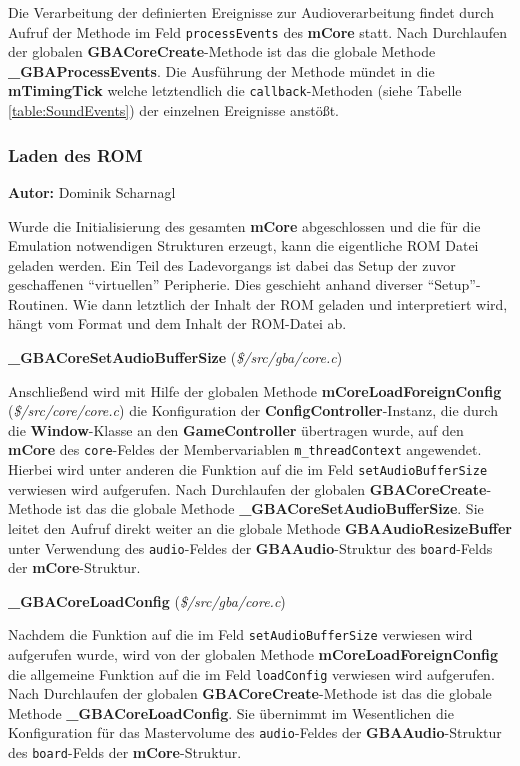 \documentclass[11pt,a4paper]{scrartcl}
\newcommand{\AutorDominik} {
    \vspace{-4mm}
    \large \textbf{Autor:} Dominik Scharnagl \normalsize
    \vspace{2mm}
}
\newcommand{\paratitlecode}[2] {
    \vspace{5mm}
    \large \textbf{#1} \normalsize(\textit{\${#2}})
    \vspace{2mm}\newline
}
\begin{document}
Die Verarbeitung der definierten Ereignisse zur Audioverarbeitung findet durch Aufruf der Methode im Feld \verb|processEvents| des \textbf{mCore} statt. Nach Durchlaufen der globalen \textbf{GBACoreCreate}-Methode ist das die globale Methode \textbf{{\_}GBAProcessEvents}. Die Ausf\"uhrung der Methode m\"undet in die \textbf{mTimingTick} welche letztendlich die \verb|callback|-Methoden (siehe Tabelle \ref{table:SoundEvents}) der einzelnen Ereignisse anst\"o{\ss}t.


\newpage
\subsubsection{Laden des ROM}
\AutorDominik

Wurde die Initialisierung des gesamten \textbf{mCore} abgeschlossen und die f\"ur die Emulation notwendigen Strukturen erzeugt, kann die eigentliche ROM Datei geladen werden. Ein Teil des Ladevorgangs ist dabei das Setup der zuvor geschaffenen \enquote{virtuellen} Peripherie. Dies geschieht anhand diverser \enquote{Setup}-Routinen. Wie dann letztlich der Inhalt der ROM geladen und interpretiert wird, h\"angt vom Format und dem Inhalt der ROM-Datei ab.

\paratitlecode{{\_}GBACoreSetAudioBufferSize}{/src/gba/core.c}
Anschlie{\ss}end wird mit Hilfe der globalen Methode \textbf{mCoreLoadForeignConfig} (\textit{\$/src/core/core.c}) die Konfiguration der \textbf{ConfigController}-Instanz, die durch die \textbf{Window}-Klasse an den \textbf{GameController} \"ubertragen wurde, auf den \textbf{mCore} des \verb|core|-Feldes der Membervariablen \verb|m_threadContext| angewendet. Hierbei wird unter anderen die Funktion auf die im Feld \verb|setAudioBufferSize| verwiesen wird aufgerufen. Nach Durchlaufen der globalen \textbf{GBACoreCreate}-Methode ist das die globale Methode \textbf{{\_}GBACoreSetAudioBufferSize}. Sie leitet den Aufruf direkt weiter an die globale Methode \textbf{GBAAudioResizeBuffer} unter Verwendung des \verb|audio|-Feldes der \textbf{GBAAudio}-Struktur des \verb|board|-Felds der \textbf{mCore}-Struktur.

\paratitlecode{{\_}GBACoreLoadConfig}{/src/gba/core.c}
Nachdem die Funktion auf die im Feld \verb|setAudioBufferSize| verwiesen wird aufgerufen wurde, wird von der globalen Methode \textbf{mCoreLoadForeignConfig} die allgemeine Funktion auf die im Feld \verb|loadConfig| verwiesen wird aufgerufen. Nach Durchlaufen der globalen \textbf{GBACoreCreate}-Methode ist das die globale Methode \textbf{{\_}GBACoreLoadConfig}. Sie \"ubernimmt im Wesentlichen die Konfiguration f\"ur das Mastervolume des \verb|audio|-Feldes der \textbf{GBAAudio}-Struktur des \verb|board|-Felds der \textbf{mCore}-Struktur.
\end{document}
